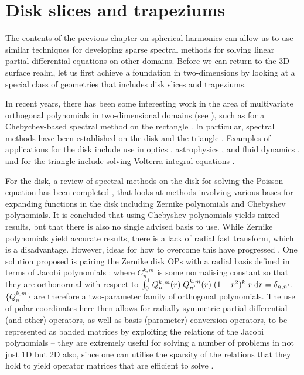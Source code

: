 

\chapter{Disk slices and trapeziums}\label{CHAPTER:diskslice}

The contents of the previous chapter on spherical harmonics can allow us to use similar techniques for developing sparse spectral methods for solving linear partial differential equations on other domains. Before we can return to the 3D surface realm, let us first achieve a foundation in two-dimensions by looking at a special class of geometries that includes disk slices and trapeziums.

In recent years, there has been some interesting work in the area of multivariate orthogonal polynomials in two-dimensional domains (see \cite{dunkl2014orthogonal}), such as for a Chebychev-based spectral method on the rectangle \cite{julien2009efficient}. In particular, spectral methods have been established on the disk \cite{boyd2011comparing, vasil2016tensor} and the triangle \cite{olver2019triangle}. Examples of applications for the disk include use in optics \cite{mahajan2007orthonormal}, astrophysics \cite{pringle1981accretion}, and fluid dynamics \cite{eggels1994fully, noll1976zernike, kerswell2005recent}, and for the triangle include solving Volterra integral equations \cite{gutleb2020sparse}. 

For the disk, a review of spectral methods on the disk for solving the Poisson equation has been completed \cite{boyd2011comparing}, that looks at methods involving various bases for expanding functions in the disk including Zernike polynomials and Chebyshev polynomials. It is concluded that using Chebyshev polynomials yields mixed results, but that there is also no single advised basis to use. While Zernike polynomials yield accurate results, there is a lack of radial fast transform, which is a disadvantage. However, ideas for how to overcome this have progressed \cite{slevinsky2018use, sakai2009application, wilber2017computing}. One solution proposed is pairing the Zernike disk OPs with a radial basis defined in terms of Jacobi polynomials \cite{vasil2016tensor}:
where $C_n^{k,m}$ is some normalising constant so that they are orthonormal with respect to $\int_0^1 Q_n^{k,m}(r) \; Q_{n'}^{k,m}(r) \; (1-r^2)^k \; r \; {\rm d} r = \delta_{n,n'}$. $\{Q_n^{k,m}\}$ are therefore a two-parameter family of orthogonal polynomials. The use of polar coordinates here then allows for radially symmetric partial differential (and other) operators, as well as basis (parameter) conversion operators, to be represented as banded matrices by exploiting the relations of the Jacobi polynomials -- they are extremely useful for solving a number of problems in not just 1D but 2D also, since one can utilise the sparsity of the relations that they hold to yield operator matrices that are efficient to solve \cite{doha2006efficient}.

